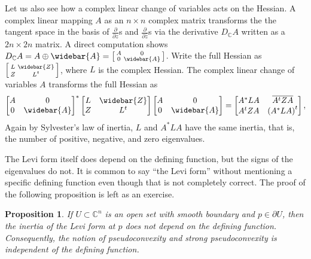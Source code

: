 \documentclass[12pt,openany]{book}
\newcommand{\C}{{\mathbb{C}}}
\theoremstyle{plain}
\newtheorem{prop}[thm]{Proposition}
\theoremstyle{remark}
\theoremstyle{definition}
\theoremstyle{exercise}
\theoremstyle{example}
\begin{document}
Let us also see how a complex linear change of variables
acts on the Hessian.  A complex linear mapping $A$ as
an $n \times n$ complex matrix
transforms the the tangent space
in the basis of $\frac{\partial}{\partial z}$s and
$\frac{\partial}{\partial \bar{z}}$s
via the derivative $D_{\C} A$ written as a $2n \times 2n$ matrix.
A direct computation shows $D_{\C} A = A \oplus \widebar{A} =
\left[ \begin{smallmatrix} A & 0 \\ 0 & \widebar{A} \end{smallmatrix}
\right]$.
Write the full Hessian as
$\left[ \begin{smallmatrix} L & \widebar{Z} \\ Z & L^t \end{smallmatrix}
\right]$, where $L$ is the complex Hessian.  The complex linear change
of variables $A$ transforms
the full Hessian as
\begin{equation*}
{\begin{bmatrix} A & 0 \\ 0 & \widebar{A} \end{bmatrix}}^*
\begin{bmatrix} L & \widebar{Z} \\ Z & L^t \end{bmatrix}
\begin{bmatrix} A & 0 \\ 0 & \widebar{A} \end{bmatrix}
=
\begin{bmatrix} A^*LA & \overline{A^tZA} \\ A^tZA & {(A^*LA)}^t \end{bmatrix} ,
\end{equation*}
Again by Sylvester's law of inertia,
$L$ and $A^*LA$ have the same inertia, that is,
the number of positive, negative, and zero eigenvalues.

The Levi form itself does depend on the defining function, but the signs of
the eigenvalues do not.  It is common to say ``the
Levi form'' without mentioning a specific defining function
even though that is not completely correct.
The proof of the following proposition is left as an exercise.

\begin{prop} \label{prop:inertiainvariant}
If $U \subset \C^n$ is an open set with smooth boundary and $p \in \partial
U$, then the inertia of the Levi form at $p$
does not depend on the defining function.
Consequently, the notion of pseudoconvexity and strong pseudoconvexity is
independent of the defining function.
\end{prop}
\end{document}
